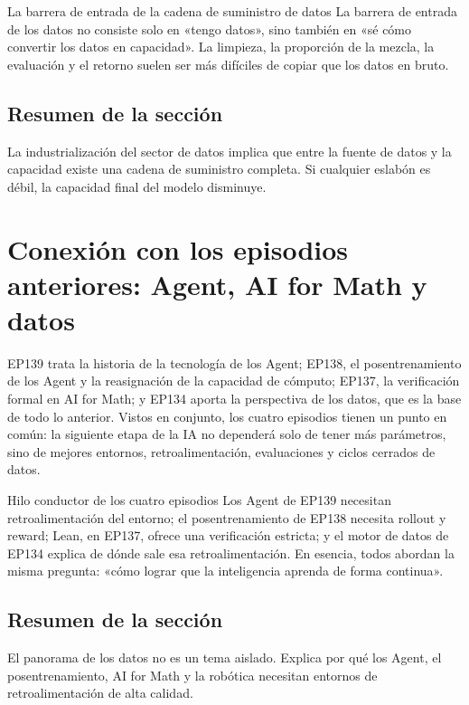 \documentclass[a4paper]{article}
\begin{document}
\begin{knowledgebox}{La barrera de entrada de la cadena de suministro de datos}
La barrera de entrada de los datos no consiste solo en «tengo datos», sino también en «sé cómo convertir los datos en capacidad». La limpieza, la proporción de la mezcla, la evaluación y el retorno suelen ser más difíciles de copiar que los datos en bruto.
\end{knowledgebox}

\subsection{Resumen de la sección}

La industrialización del sector de datos implica que entre la fuente de datos y la capacidad existe una cadena de suministro completa. Si cualquier eslabón es débil, la capacidad final del modelo disminuye.
\section{Conexión con los episodios anteriores: Agent, AI for Math y datos}

EP139 trata la historia de la tecnología de los Agent; EP138, el posentrenamiento de los Agent y la reasignación de la capacidad de cómputo; EP137, la verificación formal en AI for Math; y EP134 aporta la perspectiva de los datos, que es la base de todo lo anterior. Vistos en conjunto, los cuatro episodios tienen un punto en común: la siguiente etapa de la IA no dependerá solo de tener más parámetros, sino de mejores entornos, retroalimentación, evaluaciones y ciclos cerrados de datos.

\begin{knowledgebox}{Hilo conductor de los cuatro episodios}
Los Agent de EP139 necesitan retroalimentación del entorno; el posentrenamiento de EP138 necesita rollout y reward; Lean, en EP137, ofrece una verificación estricta; y el motor de datos de EP134 explica de dónde sale esa retroalimentación. En esencia, todos abordan la misma pregunta: «cómo lograr que la inteligencia aprenda de forma continua».
\end{knowledgebox}

\subsection{Resumen de la sección}

El panorama de los datos no es un tema aislado. Explica por qué los Agent, el posentrenamiento, AI for Math y la robótica necesitan entornos de retroalimentación de alta calidad.
\end{document}
